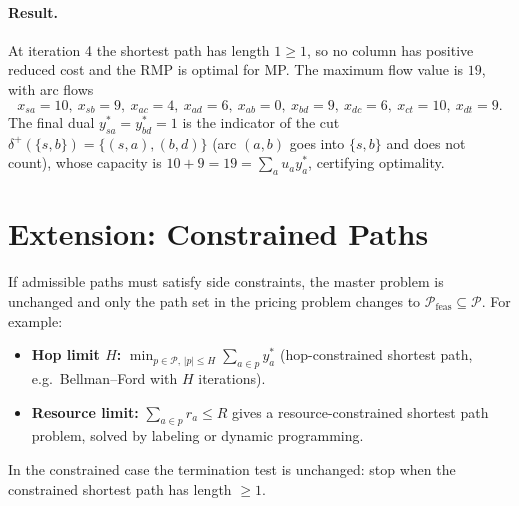 \documentclass[11pt]{article}
\begin{document}
\paragraph{Result.} At iteration 4 the shortest path has length $1\ge 1$, so no column has positive reduced cost and the RMP is optimal for MP. The maximum flow value is $19$, with arc flows
\[
x_{sa}=10,\ x_{sb}=9,\ x_{ac}=4,\ x_{ad}=6,\ x_{ab}=0,\ x_{bd}=9,\ x_{dc}=6,\ x_{ct}=10,\ x_{dt}=9 .
\]
The final dual $y^*_{sa}=y^*_{bd}=1$ is the indicator of the cut $\delta^+(\{s,b\})=\{(s,a),(b,d)\}$ (arc $(a,b)$ goes into $\{s,b\}$ and does not count), whose capacity is $10+9=19=\sum_a u_a y^*_a$, certifying optimality.

\section{Extension: Constrained Paths}
If admissible paths must satisfy side constraints, the master problem is unchanged and only the path set in the pricing problem changes to $\mathcal{P}_{\text{feas}}\subseteq\mathcal{P}$. For example:
\begin{itemize}
  \item \textbf{Hop limit $H$:} $\min_{p\in\mathcal{P},\,|p|\le H}\sum_{a\in p}y^*_a$ (hop-constrained shortest path, e.g.\ Bellman--Ford with $H$ iterations).
  \item \textbf{Resource limit:} $\sum_{a\in p} r_a\le R$ gives a resource-constrained shortest path problem, solved by labeling or dynamic programming.
\end{itemize}
In the constrained case the termination test is unchanged: stop when the constrained shortest path has length $\ge 1$.
\end{document}
